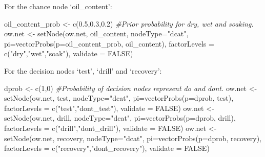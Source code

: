 \documentclass[
]{article}
\newenvironment{Shaded}{\begin{snugshade}}{\end{snugshade}}
\newcommand{\AttributeTok}[1]{\textcolor[rgb]{0.77,0.63,0.00}{#1}}
\newcommand{\CommentTok}[1]{\textcolor[rgb]{0.56,0.35,0.01}{\textit{#1}}}
\newcommand{\ConstantTok}[1]{\textcolor[rgb]{0.00,0.00,0.00}{#1}}
\newcommand{\DecValTok}[1]{\textcolor[rgb]{0.00,0.00,0.81}{#1}}
\newcommand{\FloatTok}[1]{\textcolor[rgb]{0.00,0.00,0.81}{#1}}
\newcommand{\FunctionTok}[1]{\textcolor[rgb]{0.00,0.00,0.00}{#1}}
\newcommand{\NormalTok}[1]{#1}
\newcommand{\OtherTok}[1]{\textcolor[rgb]{0.56,0.35,0.01}{#1}}
\newcommand{\StringTok}[1]{\textcolor[rgb]{0.31,0.60,0.02}{#1}}
\begin{document}
For the chance node `oil\_content':

\begin{Shaded}
\begin{Highlighting}[]
\NormalTok{oil\_content\_prob }\OtherTok{\textless{}{-}} \FunctionTok{c}\NormalTok{(}\FloatTok{0.5}\NormalTok{,}\FloatTok{0.3}\NormalTok{,}\FloatTok{0.2}\NormalTok{) }\CommentTok{\#Prior probability for dry, wet and soaking.}
\NormalTok{ow.net }\OtherTok{\textless{}{-}} \FunctionTok{setNode}\NormalTok{(ow.net, oil\_content, }\AttributeTok{nodeType=}\StringTok{"dcat"}\NormalTok{, }\AttributeTok{pi=}\FunctionTok{vectorProbs}\NormalTok{(}\AttributeTok{p=}\NormalTok{oil\_content\_prob, oil\_content), }\AttributeTok{factorLevels =} \FunctionTok{c}\NormalTok{(}\StringTok{"dry"}\NormalTok{,}\StringTok{"wet"}\NormalTok{,}\StringTok{"soak"}\NormalTok{), }\AttributeTok{validate =} \ConstantTok{FALSE}\NormalTok{)}
\end{Highlighting}
\end{Shaded}

For the decision nodes `test', `drill' and `recovery':

\begin{Shaded}
\begin{Highlighting}[]
\NormalTok{dprob }\OtherTok{\textless{}{-}} \FunctionTok{c}\NormalTok{(}\DecValTok{1}\NormalTok{,}\DecValTok{0}\NormalTok{) }\CommentTok{\#Probability of decision nodes represent do and don\textquotesingle{}t.}
\NormalTok{ow.net }\OtherTok{\textless{}{-}} \FunctionTok{setNode}\NormalTok{(ow.net, test, }\AttributeTok{nodeType=}\StringTok{"dcat"}\NormalTok{, }\AttributeTok{pi=}\FunctionTok{vectorProbs}\NormalTok{(}\AttributeTok{p=}\NormalTok{dprob, test), }\AttributeTok{factorLevels =} \FunctionTok{c}\NormalTok{(}\StringTok{"test"}\NormalTok{,}\StringTok{"dont\_test"}\NormalTok{), }\AttributeTok{validate =} \ConstantTok{FALSE}\NormalTok{)}
\NormalTok{ow.net }\OtherTok{\textless{}{-}} \FunctionTok{setNode}\NormalTok{(ow.net, drill, }\AttributeTok{nodeType=}\StringTok{"dcat"}\NormalTok{, }\AttributeTok{pi=}\FunctionTok{vectorProbs}\NormalTok{(}\AttributeTok{p=}\NormalTok{dprob, drill), }\AttributeTok{factorLevels =} \FunctionTok{c}\NormalTok{(}\StringTok{"drill"}\NormalTok{,}\StringTok{"dont\_drill"}\NormalTok{), }\AttributeTok{validate =} \ConstantTok{FALSE}\NormalTok{)}
\NormalTok{ow.net }\OtherTok{\textless{}{-}} \FunctionTok{setNode}\NormalTok{(ow.net, recovery, }\AttributeTok{nodeType=}\StringTok{"dcat"}\NormalTok{, }\AttributeTok{pi=}\FunctionTok{vectorProbs}\NormalTok{(}\AttributeTok{p=}\NormalTok{dprob, recovery), }\AttributeTok{factorLevels =} \FunctionTok{c}\NormalTok{(}\StringTok{"recovery"}\NormalTok{,}\StringTok{"dont\_recovery"}\NormalTok{), }\AttributeTok{validate =} \ConstantTok{FALSE}\NormalTok{)}
\end{Highlighting}
\end{Shaded}
\end{document}
